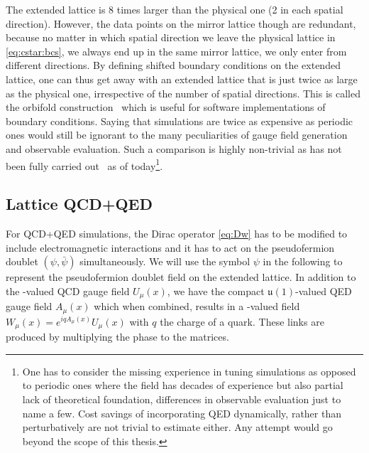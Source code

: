 The extended lattice is \num{8} times larger than the physical one (\num{2} in each spatial direction).
However, the data points on the mirror lattice though are redundant, because no matter in which spatial direction we leave the physical lattice in \cref{eq:cstar:bcs}, we always end up in the same mirror lattice, we only enter from different directions.
By defining shifted boundary conditions on the extended lattice, one can thus get away with an extended lattice that is just twice as large as the physical one, irrespective of the number of spatial \Cstar directions.
This is called the orbifold construction~\cite{openqxd} which is useful for software implementations of \Cstar boundary conditions.
Saying that \Cstar simulations are twice as expensive as periodic ones would still be ignorant to the many peculiarities of gauge field generation and observable evaluation.
Such a comparison is highly non-trivial as has not been fully carried out~\cite{RCstar22} as of today\footnote{One has to consider the missing experience in tuning \Cstar simulations as opposed to periodic ones where the field has decades of experience but also partial lack of theoretical foundation, differences in observable evaluation just to name a few. Cost savings of incorporating QED dynamically, rather than perturbatively are not trivial to estimate either. Any attempt would go beyond the scope of this thesis.}.

\subsection{Lattice QCD+QED}

For QCD+QED simulations, the Dirac operator \cref{eq:Dw} has to be modified to include electromagnetic interactions and it has to act on the pseudofermion doublet $(\psi, \bar{\psi})$ simultaneously.
We will use the symbol $\psi$ in the following to represent the pseudofermion doublet field on the extended lattice.
In addition to the -valued QCD gauge field $U_\mu(x)$, we have the compact $\mathfrak{u}(1)$-valued QED gauge field $A_\mu(x)$ which when combined, results in a -valued field $W_{\mu}(x) = e^{i q A_\mu(x)} U_\mu(x)$ with $q$ the charge of a quark.
These links are produced by multiplying the  phase to the  matrices.

